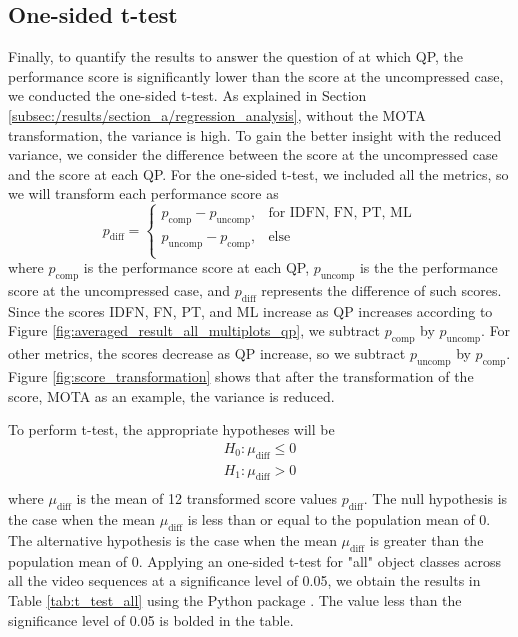 \subsection{One-sided t-test}
\label{subsec:/results/section_a/t_test}
Finally, to quantify the results to answer the question of at which QP, the performance score is significantly lower than the score at the uncompressed case, we conducted the one-sided t-test. As explained in Section \ref{subsec:/results/section_a/regression_analysis}, without the MOTA transformation, the variance is high. To gain the better insight with the reduced variance, we consider the difference between the score at the uncompressed case and the score at each QP. For the one-sided t-test, we included all the metrics, so we will transform each performance score as
\begin{equation}
  p_{\text{diff}} =
    \begin{cases}
         p_{\text{comp}} - p_{\text{uncomp}} ,& \text{for IDFN, FN, PT, ML} \\        
         p_{\text{uncomp}} - p_{\text{comp}} ,& \text{else} \\
    \end{cases}
\end{equation}
where $p_{\text{comp}}$ is the performance score at each QP, $p_{\text{uncomp}}$ is the the performance score at the uncompressed case, and $p_{\text{diff}}$ represents the difference of such scores. Since the scores IDFN, FN, PT, and ML increase as QP increases according to Figure \ref{fig:averaged_result_all_multiplots_qp}, we subtract $p_{\text{comp}}$ by $p_{\text{uncomp}}$. For other metrics, the scores decrease as QP increase, so we subtract $p_{\text{uncomp}}$ by $p_{\text{comp}}$. Figure \ref{fig:score_transformation} shows that after the transformation of the score, MOTA as an example, the variance is reduced.

To perform t-test, the appropriate hypotheses will be
\begin{equation}
    \begin{aligned}
        H_0 : \mu_{\text{diff}} \leq 0 \\
        H_1 : \mu_{\text{diff}} > 0 \\
    \end{aligned}
\end{equation}
where $\mu_{\text{diff}}$ is the mean of 12 transformed score values $p_{\text{diff}}$. The null hypothesis is the case when the mean $\mu_{\text{diff}}$ is less than or equal to the population mean of 0. The alternative hypothesis is the case when the mean $\mu_{\text{diff}}$ is greater than the population mean of 0. Applying an one-sided t-test for "all" object classes across all the video sequences at a significance level of 0.05, we obtain the results in Table \ref{tab:t_test_all} using the Python package \cite{virtanen_scipy_2020}. The value less than the significance level of 0.05 is bolded in the table.
